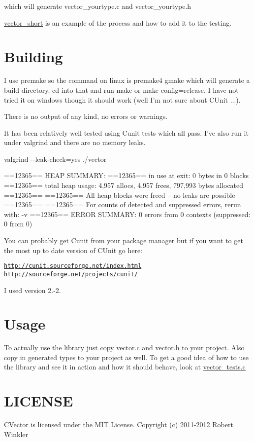 which will generate vector\-\_\-yourtype.\-c and vector\-\_\-yourtype.\-h

\hyperlink{structvector__short}{vector\-\_\-short} is an example of the process and how to add it to the testing.\hypertarget{index_Building}{}\section{\-Building}\label{index_Building}
\-I use premake so the command on linux is premake4 gmake which will generate a build directory. cd into that and run make or make config=release. \-I have not tried it on windows though it should work (well \-I'm not sure about \-C\-Unit ...).

\-There is no output of any kind, no errors or warnings.

\-It has been relatively well tested using \-Cunit tests which all pass. \-I've also run it under valgrind and there are no memory leaks.

valgrind -\/-\/leak-\/check=yes ./vector


\begin{DoxyPre}
==12365== HEAP SUMMARY:
==12365==     in use at exit: 0 bytes in 0 blocks
==12365==   total heap usage: 4,957 allocs, 4,957 frees, 797,993 bytes allocated
==12365== 
==12365== All heap blocks were freed -- no leaks are possible
==12365== 
==12365== For counts of detected and suppressed errors, rerun with: -v
==12365== ERROR SUMMARY: 0 errors from 0 contexts (suppressed: 0 from 0)
\end{DoxyPre}


\-You can probably get \-Cunit from your package manager but if you want to get the most up to date version of \-C\-Unit go here\-:

\href{http://cunit.sourceforge.net/index.html}{\tt http\-://cunit.\-sourceforge.\-net/index.\-html} \href{http://sourceforge.net/projects/cunit/}{\tt http\-://sourceforge.\-net/projects/cunit/}

\-I used version 2.-\/2.\hypertarget{index_Usage}{}\section{\-Usage}\label{index_Usage}
\-To actually use the library just copy vector.\-c and vector.\-h to your project. \-Also copy in generated types to your project as well. \-To get a good idea of how to use the library and see it in action and how it should behave, look at \hyperlink{vector__tests_8c}{vector\-\_\-tests.\-c}\hypertarget{index_LICENSE}{}\section{\-L\-I\-C\-E\-N\-S\-E}\label{index_LICENSE}
\-C\-Vector is licensed under the \-M\-I\-T \-License. \-Copyright (c) 2011-\/2012 \-Robert \-Winkler

